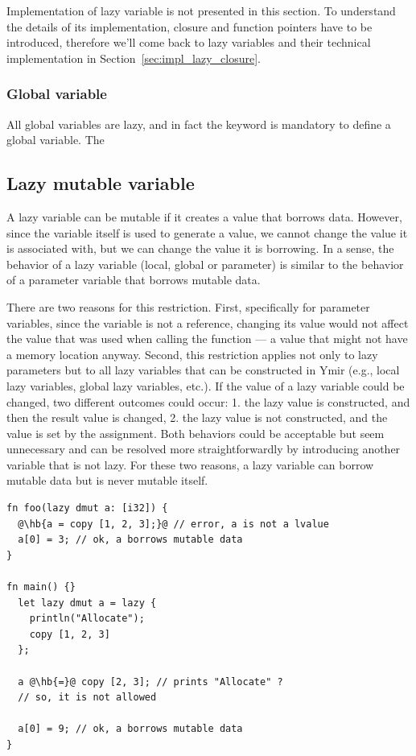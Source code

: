 Implementation of lazy variable is not presented in this section. To understand
the details of its implementation, closure and function pointers have to be
introduced, therefore we'll come back to lazy variables and their technical
implementation in Section~\ref{sec:impl_lazy_closure}.

\subsubsection*{Global variable}

All global variables are lazy, and in fact the keyword  is mandatory
to define a global variable. The

\subsection {Lazy mutable variable}
\label{sec:variable_lazy_mut}

A lazy variable can be mutable if it creates a value that borrows data. However,
since the variable itself is used to generate a value, we cannot change the
value it is associated with, but we can change the value it is borrowing. In a
sense, the behavior of a lazy variable (local, global or parameter) is similar
to the behavior of a parameter variable that borrows mutable data.

There are two reasons for this restriction. First, specifically for parameter
variables, since the variable is not a reference, changing its value would not
affect the value that was used when calling the function — a value that might
not have a memory location anyway. Second, this restriction applies not only to
lazy parameters but to all lazy variables that can be constructed in Ymir (e.g.,
local lazy variables, global lazy variables, etc.). If the value of a lazy
variable could be changed, two different outcomes could occur: 1. the lazy value
is constructed, and then the result value is changed, 2. the lazy value is not
constructed, and the value is set by the assignment. Both behaviors could be
acceptable but seem unnecessary and can be resolved more straightforwardly by
introducing another variable that is not lazy. For these two reasons, a lazy
variable can borrow mutable data but is never mutable itself.

\begin{lstlisting}[style=coloredverbatimError, escapechar=@]
fn foo(lazy dmut a: [i32]) {
  @\hb{a = copy [1, 2, 3];}@ // error, a is not a lvalue
  a[0] = 3; // ok, a borrows mutable data
}

fn main() {}
  let lazy dmut a = lazy {
    println("Allocate");
    copy [1, 2, 3]
  };

  a @\hb{=}@ copy [2, 3]; // prints "Allocate" ?
  // so, it is not allowed

  a[0] = 9; // ok, a borrows mutable data
}
\end{lstlisting}

